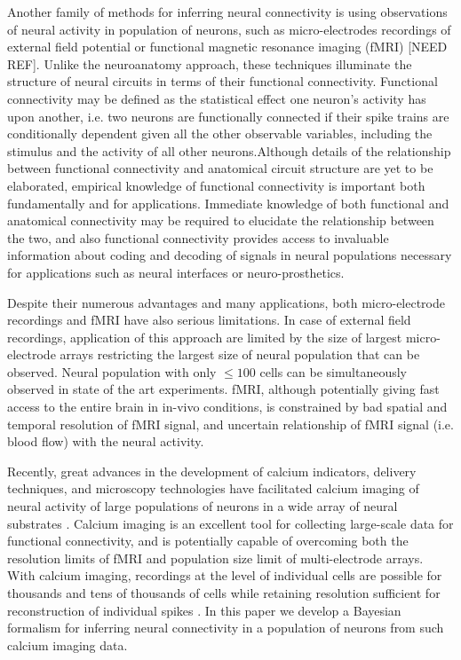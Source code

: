 Another family of methods for inferring neural connectivity is using observations of neural activity in population of neurons, such as micro-electrodes recordings of external field potential \cite{Meister1994, Litke2003, Litke2004, PILL07, Stevenson2008} or functional magnetic resonance imaging (fMRI) [NEED REF]. Unlike the neuroanatomy approach, these techniques illuminate the structure of neural circuits in terms of their functional connectivity. Functional connectivity may be defined as the statistical effect one neuron's activity has upon another, i.e. two neurons are functionally connected if their spike trains are conditionally dependent given all the other observable variables, including the stimulus and the activity of all other neurons.Although details of the relationship between functional connectivity and anatomical circuit structure are yet to be elaborated, empirical knowledge of functional connectivity is important both fundamentally and for applications. Immediate knowledge of both functional and anatomical connectivity may be required to elucidate the relationship between the two, and also functional connectivity provides access to invaluable information about coding and decoding of signals in neural populations necessary for applications such as neural interfaces or neuro-prosthetics.

Despite their numerous advantages and many applications, both micro-electrode recordings and fMRI have also serious limitations. In case of external field recordings, application of this approach are limited by the size of largest micro-electrode arrays restricting the largest size of neural population that can be observed. Neural population with only $\leq 100$ cells can be simultaneously observed in state of the art experiments. fMRI, although potentially giving fast access to the entire brain in in-vivo conditions, is constrained by bad spatial and temporal resolution of fMRI signal, and uncertain relationship of fMRI signal (i.e. blood flow) with the neural activity.

Recently, great advances in the development of calcium indicators, delivery techniques, and microscopy technologies have facilitated calcium imaging of neural activity of large populations of neurons in a wide array of neural substrates \cite{Ikegaya2005, Nagayama2007, Nevian2007, Gobel07b}. Calcium imaging is an excellent tool for collecting large-scale data for functional connectivity, and is potentially capable of overcoming both the resolution limits of fMRI and population size limit of multi-electrode arrays. With calcium imaging, recordings at the level of individual cells are possible for thousands and tens of thousands of cells while retaining resolution sufficient for reconstruction of individual spikes \cite{Ikegaya2005}. In this paper we develop a Bayesian formalism for inferring neural connectivity in a population of neurons from such calcium imaging data.